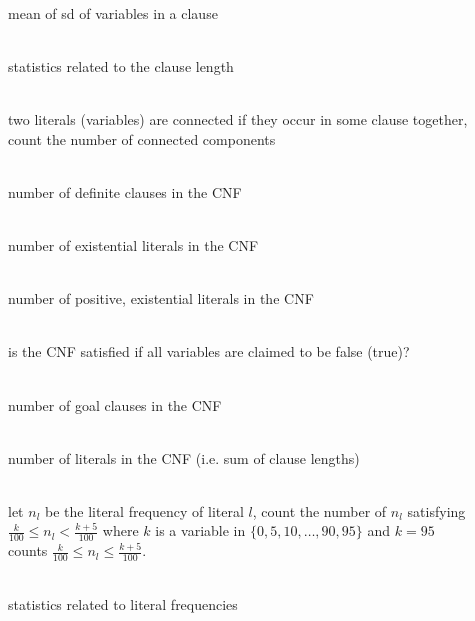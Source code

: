\begin{description}
\item[] \hfill{} \\
  mean of sd of variables in a clause
\item[] \hfill{} \\
  statistics related to the clause length
\item[] \hfill{} \\
  two literals (variables) are connected if they occur in some clause together,
  count the number of connected components
\item[] \hfill{} \\
  number of definite clauses in the CNF
\item[] \hfill{} \\
  number of existential literals in the CNF
\item[] \hfill{} \\
  number of positive, existential literals in the CNF
\item[] \hfill{} \\
  is the CNF satisfied if all variables are claimed to be false (true)?
\item[] \hfill{} \\
  number of goal clauses in the CNF
\item[] \hfill{} \\
  number of literals in the CNF (i.e. sum of clause lengths)
\item[] \hfill{} \\
  let $n_l$ be the literal frequency of literal $l$,
  count the number of $n_l$ satisfying $\frac{k}{100} \leq n_l < \frac{k+5}{100}$
  where $k$ is a variable in $\{0,5,10,\ldots,90,95\}$ and $k=95$ counts
  $\frac{k}{100} \leq n_l \leq \frac{k+5}{100}$.
\item[] \hfill{} \\
  statistics related to literal frequencies
\item[] \hfill{} \\

\end{description}
